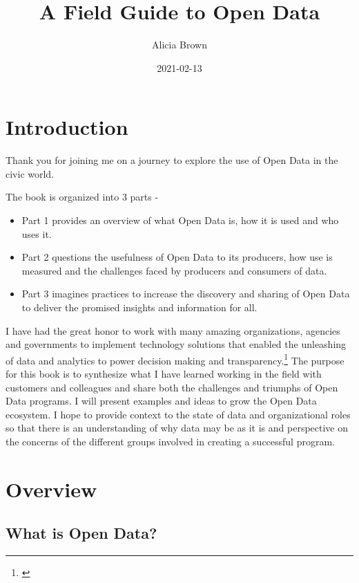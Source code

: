 \documentclass[
  openany]{book}
\title{A Field Guide to Open Data}
\author{Alicia Brown}
\date{2021-02-13}
\providecommand{\tightlist}{%
  \setlength{\itemsep}{0pt}\setlength{\parskip}{0pt}}
\begin{document}
\maketitle

{
\setcounter{tocdepth}{1}
\tableofcontents
}
\hypertarget{introduction}{%
\chapter{Introduction}\label{introduction}}

Thank you for joining me on a journey to explore the use of Open Data in the civic world.

The book is organized into 3 parts -

\begin{itemize}
\tightlist
\item
  Part 1 provides an overview of what Open Data is, how it is used and who uses it.
\item
  Part 2 questions the usefulness of Open Data to its producers, how use is measured and the challenges faced by producers and consumers of data.
\item
  Part 3 imagines practices to increase the discovery and sharing of Open Data to deliver the promised insights and information for all.
\end{itemize}

I have had the great honor to work with many amazing organizations, agencies and governments to implement technology solutions that enabled the unleashing of data and analytics to power decision making and transparency.\footnote{\citet{blog5years}} The purpose for this book is to synthesize what I have learned working in the field with customers and colleagues and share both the challenges and triumphs of Open Data programs. I will present examples and ideas to grow the Open Data ecosystem. I hope to provide context to the state of data and organizational roles so that there is an understanding of why data may be as it is and perspective on the concerns of the different groups involved in creating a successful program.

\hypertarget{overview}{%
\chapter{Overview}\label{overview}}

\hypertarget{what-is-open-data}{%
\section{What is Open Data?}\label{what-is-open-data}}
\end{document}
